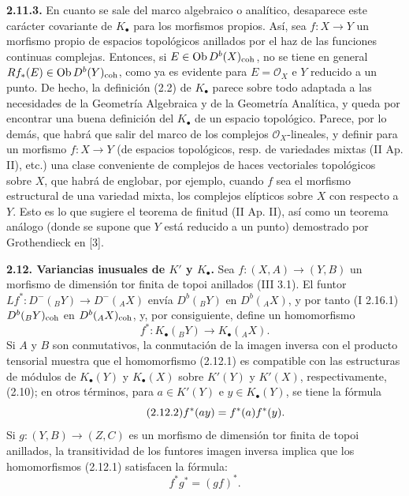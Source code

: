 \textbf{2.11.3.} En cuanto se sale del marco algebraico o analítico, desaparece este carácter covariante de \(K_{\bullet}\) para los morfismos propios. Así, sea \(f:X\to Y\) un morfismo propio de espacios topológicos anillados por el haz de las funciones continuas complejas. Entonces, si \(E\in\Ob D^b(X)_{\coh}\), no se tiene en general \(Rf_*(E)\in\Ob D^b(Y)_{\coh}\), como ya es evidente para \(E=\mathcal O_X\) e \(Y\) reducido a un punto. De hecho, la definición (2.2) de \(K_{\bullet}\) parece sobre todo adaptada a las necesidades de la Geometría Algebraica y de la Geometría Analítica, y queda por encontrar una buena definición del \(K_{\bullet}\) de un espacio topológico. Parece, por lo demás, que habrá que salir del marco de los complejos \(\mathcal O_X\)-lineales, y definir para un morfismo \(f:X\to Y\) (de espacios topológicos, resp. de variedades mixtas (II Ap. II), etc.) una clase conveniente de complejos de haces vectoriales topológicos sobre \(X\), que habrá de englobar, por ejemplo, cuando \(f\) sea el morfismo estructural de una variedad mixta, los complejos elípticos sobre \(X\) con respecto a \(Y\). Esto es lo que sugiere el teorema de finitud (II Ap. II), así como un teorema análogo (donde se supone que \(Y\) está reducido a un punto) demostrado por Grothendieck en [3].

\textbf{2.12. Variancias inusuales de \(K'\) y \(K_{\bullet}\).} Sea \(f:(X,A)\longrightarrow(Y,B)\) un morfismo de dimensión tor finita de topoi anillados (III 3.1). El funtor \(Lf^*:D^-({}_B Y)\longrightarrow D^-({}_A X)\) envía \(D^b({}_B Y)\) en \(D^b({}_A X)\), y por tanto (I 2.16.1) \(D^b({}_B Y)_{\coh}\) en \(D^b({}_A X)_{\coh}\), y, por consiguiente, define un homomorfismo
\begin{equation}\tag{2.12.1}
 f^*:K_\bullet({}_B Y)\longrightarrow K_\bullet({}_A X).
\end{equation}
Si \(A\) y \(B\) son conmutativos, la conmutación de la imagen inversa con el producto tensorial muestra que el homomorfismo (2.12.1) es compatible con las estructuras de módulos de \(K_{\bullet}(Y)\) y \(K_{\bullet}(X)\) sobre \(K'(Y)\) y \(K'(X)\), respectivamente, (2.10); en otros términos, para \(a\in K'(Y)\) e \(y\in K_{\bullet}(Y)\), se tiene la fórmula
\begin{equation}\tag{2.12.2}
 f^*(ay)=\sisi{a f^*(y)}{f^*(a)f^*(y)}.
\end{equation}
Si \(g:(Y,B)\to(Z,C)\) es un morfismo de dimensión tor finita de topoi anillados, la transitividad de los funtores imagen inversa implica que los homomorfismos (2.12.1) satisfacen la fórmula:
\begin{equation}\tag{2.12.1.1}
 f^*g^*=(gf)^*.
\end{equation}

